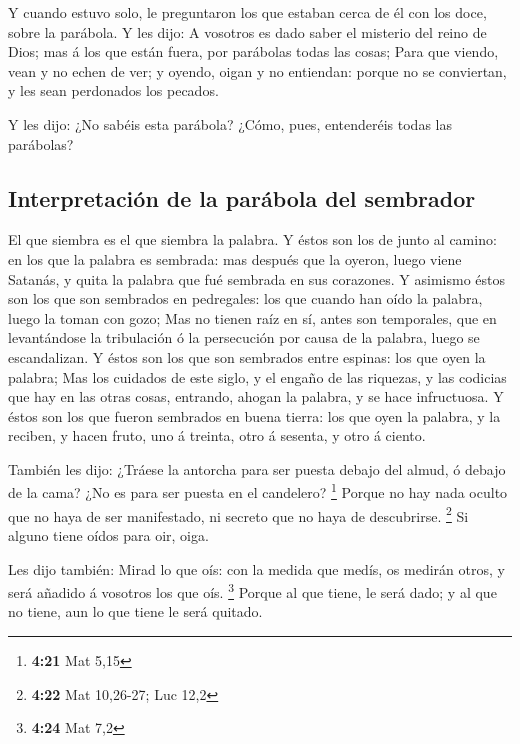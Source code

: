  Y cuando estuvo solo, le preguntaron los que estaban cerca
de él con los doce, sobre la parábola.  Y les dijo: A
vosotros es dado saber el misterio del reino de Dios; mas á los que
están fuera, por parábolas todas las cosas;  Para que
viendo, vean y no echen de ver; y oyendo, oigan y no entiendan: porque
no se conviertan, y les sean perdonados los pecados.

 Y les dijo: ¿No sabéis esta parábola? ¿Cómo, pues,
entenderéis todas las parábolas?

\hypertarget{interpretaciuxf3n-de-la-paruxe1bola-del-sembrador}{%
\subsection{Interpretación de la parábola del
sembrador}\label{interpretaciuxf3n-de-la-paruxe1bola-del-sembrador}}

 El que siembra es el que siembra la palabra. 
Y éstos son los de junto al camino: en los que la palabra es sembrada:
mas después que la oyeron, luego viene Satanás, y quita la palabra que
fué sembrada en sus corazones.  Y asimismo éstos son los
que son sembrados en pedregales: los que cuando han oído la palabra,
luego la toman con gozo;  Mas no tienen raíz en sí, antes
son temporales, que en levantándose la tribulación ó la persecución por
causa de la palabra, luego se escandalizan.  Y éstos son
los que son sembrados entre espinas: los que oyen la palabra;
 Mas los cuidados de este siglo, y el engaño de las
riquezas, y las codicias que hay en las otras cosas, entrando, ahogan la
palabra, y se hace infructuosa.  Y éstos son los que fueron
sembrados en buena tierra: los que oyen la palabra, y la reciben, y
hacen fruto, uno á treinta, otro á sesenta, y otro á ciento.

 También les dijo: ¿Tráese la antorcha para ser puesta
debajo del almud, ó debajo de la cama? ¿No es para ser puesta en el
candelero? \footnote{\textbf{4:21} Mat 5,15}  Porque no hay
nada oculto que no haya de ser manifestado, ni secreto que no haya de
descubrirse. \footnote{\textbf{4:22} Mat 10,26-27; Luc 12,2}
 Si alguno tiene oídos para oir, oiga.

 Les dijo también: Mirad lo que oís: con la medida que
medís, os medirán otros, y será añadido á vosotros los que oís.
\footnote{\textbf{4:24} Mat 7,2}  Porque al que tiene, le
será dado; y al que no tiene, aun lo que tiene le será quitado.

